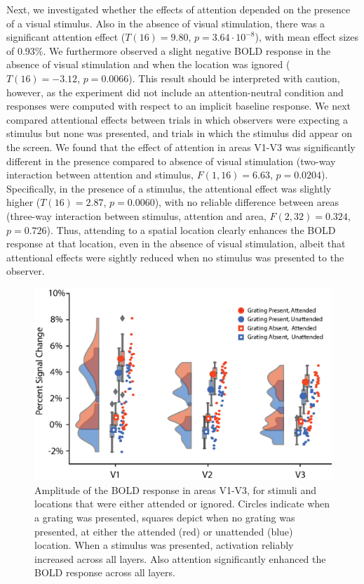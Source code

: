 \documentclass[9pt,lineno]{aperture}
\begin{document}
Next, we investigated whether the effects of attention depended on the presence of a visual stimulus. Also in the absence of visual stimulation, there was a significant attention effect ($T(16)=9.80$, $p=3.64 \cdot 10^{-8}$), with mean effect sizes of 0.93\%. We furthermore observed a slight negative BOLD response in the absence of visual stimulation and when the location was ignored ($T(16)=-3.12$, $p=0.0066$). This result should be interpreted with caution, however, as the experiment did not include an attention-neutral condition and responses were computed with respect to an implicit baseline response. We next compared attentional effects between trials in which observers were expecting a stimulus but none was presented, and trials in which the stimulus did appear on the screen. We found that the effect of attention in areas V1-V3 was significantly different in the presence compared to absence of visual stimulation (two-way interaction between attention and stimulus, $F(1,16)=6.63$, $p=0.0204$). Specifically, in the presence of a stimulus, the attentional effect was slightly higher ($T(16)=2.87$, $p=0.0060$), with no reliable difference between areas (three-way interaction between stimulus, attention and area, $F(2,32)=0.324$, $p=0.726$). Thus, attending to a spatial location clearly enhances the BOLD response at that location, even in the absence of visual stimulation, albeit that attentional effects were sightly reduced when no stimulus was presented to the observer.

\begin{figure}
\includegraphics[width=\linewidth]{img/region_stats.eps}
\caption{Amplitude of the BOLD response in areas V1-V3, for stimuli and locations that were either attended or ignored. Circles indicate when a grating was presented, squares depict when no grating was presented, at either the attended (red) or unattended (blue) location. When a stimulus was presented, activation reliably increased across all layers. Also attention significantly enhanced the BOLD response across all layers. }
\label{fig:region_stats}
\end{figure}
\end{document}
